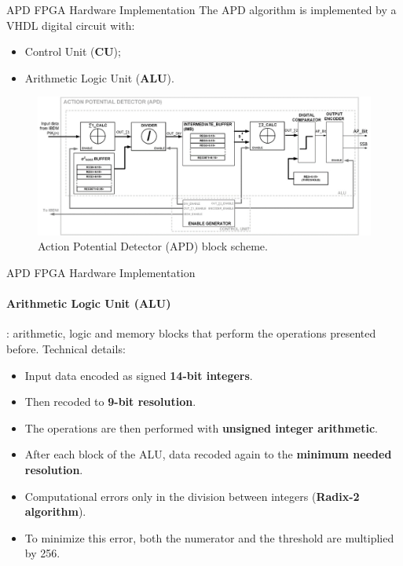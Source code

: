 \documentclass{beamer}
\begin{document}
\begin{frame}{APD FPGA Hardware Implementation} 
    The APD algorithm is implemented by a VHDL digital circuit with:
    \vspace{-5mm}
    \begin{itemize}
        \item \alert{Control Unit} (\textbf{CU});
        \item \alert{Arithmetic Logic Unit} (\textbf{ALU}).
    \end{itemize}
    \begin{figure}
        \centering
        \includegraphics[width=\textwidth]{Images_Rocco/APD_scheme.png}
        \caption{Action Potential Detector (APD) block scheme.}
        \label{fig:AR_APD_scheme}
    \end{figure}
\end{frame}

\begin{frame}{APD FPGA Hardware Implementation}
    \framesubtitle{Arithmetic Logic Unit (ALU)}
    \alert{} : arithmetic, logic and memory blocks that perform the operations presented before. Technical details:
    \begin{itemize}
        \item Input data encoded as signed \textbf{14-bit integers}.
        \item Then recoded to \textbf{9-bit resolution}.
        \item The operations are then performed with \textbf{unsigned integer arithmetic}.
        \item After each block of the ALU, data recoded again to the \textbf{minimum needed resolution}.
        \item Computational errors only in the division between integers (\textbf{Radix-2 algorithm}).
        \item To minimize this error, both the numerator and the threshold are multiplied by 256.
    \end{itemize}
\end{frame}
\end{document}
